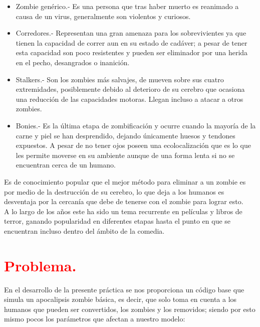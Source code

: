 \documentclass[12pt]{article}
\begin{document}
\begin{itemize}
\item Zombie genérico.- Es una persona que tras haber muerto es reanimado a causa de un virus, generalmente son violentos y curiosos.
\item Corredores.- Representan una gran amenaza para los sobrevivientes ya que tienen la capacidad de correr aun en su estado de cadáver; a pesar de tener esta capacidad son poco resistentes y pueden ser eliminador por una herida en el pecho, desangrados o inanición.
\item Stalkers.- Son los zombies más salvajes, de mueven sobre sus cuatro extremidades, posiblemente debido al deterioro de su cerebro que ocasiona una reducción de las capacidades motoras. Llegan incluso a atacar a otros zombies.
\item Bonies.- Es la última etapa de zombificación y ocurre cuando la mayoría de la carne y piel se han desprendido, dejando únicamente huesos y tendones expuestos. A pesar de no tener ojos poseen una ecolocalización que es lo que les permite moverse en su ambiente aunque de una forma lenta si no se encuentran cerca de un humano.
\end{itemize}

Es de conocimiento popular que el mejor m\'etodo para eliminar a un zombie es por medio de la destrucci\'on de su cerebro, lo que deja a los humanos es desventaja por la cercanía que debe de tenerse con el zombie para lograr esto.\\

A lo largo de los años este ha sido un tema recurrente en películas y libros de terror, ganando popularidad en diferentes etapas hasta el punto en que se encuentran incluso dentro del ámbito de la comedia.



\pagebreak
\section*{\textcolor{Red}{Problema.}}

En el desarrollo de la presente práctica se nos proporciona un código base que simula un apocalipsis zombie básica, es decir, que solo toma en cuenta a los humanos que pueden ser convertidos, los zombies y los removidos; siendo por esto mismo pocos los parámetros que afectan a nuestro  modelo:\\
\end{document}
